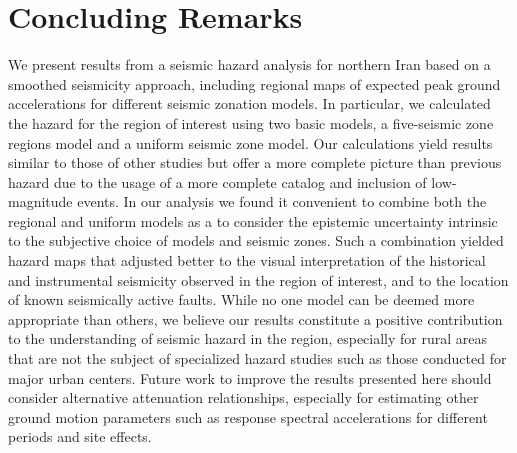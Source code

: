 
\section{Concluding Remarks}

We present results from a seismic hazard analysis for northern Iran based on a smoothed seismicity approach, including regional maps of expected peak ground accelerations for different seismic zonation models. In particular, we calculated the hazard for the region of interest using two basic models, a five-seismic zone regions model and a uniform seismic zone model. Our calculations yield results similar to those of other studies but offer a more complete picture than previous hazard  due to the usage of a more complete catalog and inclusion of low-magnitude events. In our analysis we found it convenient to combine both the regional and uniform models as a  to consider the epistemic uncertainty intrinsic to the subjective choice of models and seismic zones. Such a combination yielded hazard maps that adjusted better to the visual interpretation of the historical and instrumental seismicity observed in the region of interest, and to the location of known seismically active faults. While no one model can be deemed more appropriate than others, we believe our results constitute a positive contribution to the understanding of seismic hazard in the region, especially for rural areas that are not the subject of specialized hazard studies such as those conducted for major urban centers. Future work to improve the results presented here should consider alternative attenuation relationships, especially for estimating other ground motion parameters such as response spectral accelerations for different periods and site effects.

